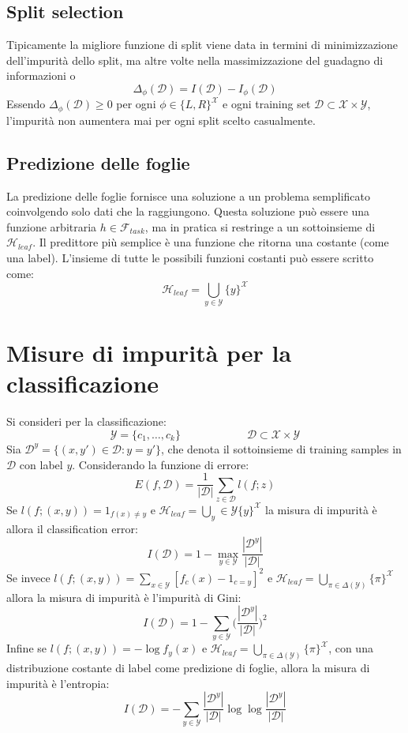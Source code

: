 	\subsection{Split selection}
	Tipicamente la migliore funzione di split viene data in termini di minimizzazione dell'impurit\`a dello split, ma altre volte nella massimizzazione del guadagno di informazioni o
	$$\Delta_\phi(\mathcal{D})=I(\mathcal{D})-I_\phi(\mathcal{D})$$
	Essendo $\Delta_\phi(\mathcal{D})\ge 0$ per ogni $\phi\in\{L,R\}^{\mathcal{X}}$ e ogni training set $\mathcal{D}\subset\mathcal{X}\times\mathcal{Y}$, l'impurit\`a non aumentera mai per ogni split scelto casualmente.

	\subsection{Predizione delle foglie}
	La predizione delle foglie fornisce una soluzione a un problema semplificato coinvolgendo solo dati che la raggiungono.
	Questa soluzione pu\`o essere una funzione arbitraria $h\in\mathcal{F}_{task}$, ma in pratica si restringe a un sottoinsieme di $\mathcal{H}_{leaf}$.
	Il predittore pi\`u semplice \`e una funzione che ritorna una costante (come una label).
	L'insieme di tutte le possibili funzioni costanti pu\`o essere scritto come:
	$$\mathcal{H}_{leaf} = \bigcup\limits_{y\in\mathcal{Y}}\{y\}^{\mathcal{X}}$$

\section{Misure di impurit\`a per la classificazione}
Si consideri per la classificazione:
$$\mathcal{Y} = \{c_1,\dots,c_k\}\qquad\qquad\qquad\mathcal{D}\subset\mathcal{X}\times\mathcal{Y}$$
Sia $\mathcal{D}^y = \{(x, y')\in \mathcal{D}: y = y'\}$, che denota il sottoinsieme di training samples in $\mathcal{D}$ con label $y$.
Considerando la funzione di errore:
$$E(f,\mathcal{D}) = \dfrac{1}{|\mathcal{D}|}\sum\limits_{z\in\mathcal{D}}l(f;z)$$
Se $l(f;(x,y))=1_{f(x)\neq y}$ e $\mathcal{H}_{leaf} = \bigcup\limits_y\in\mathcal{Y}\{y\}^\mathcal{X}$ la misura di impurit\`a \`e allora il classification error:
$$I(\mathcal{D})= 1 -\max\limits_{y\in\mathcal{Y}}\dfrac{|\mathcal{D}^y|}{|\mathcal{D}|}$$
Se invece $l(f;(x,y))=\sum\limits_{x\in\mathcal{Y}}[f_c(x)-1_{c=y}]^2$ e $\mathcal{H}_{leaf}=\bigcup\limits_{\pi\in\Delta(\mathcal{Y})}\{\pi\}^\mathcal{X}$ allora la misura di impurit\`a \`e l'impurit\`a di Gini:
$$I(\mathcal{D}) = 1-\sum\limits_{y\in\mathcal{Y}}\biggl(\dfrac{|\mathcal{D}^y|}{|\mathcal{D}|}\biggr)^2$$
Infine se $l(f;(x,y))=-\log f_y(x)$ e $\mathcal{H}_{leaf} = \bigcup\limits_{\pi\in\Delta(\mathcal{Y})}\{\pi\}^\mathcal{X}$, con una distribuzione costante di label come predizione di foglie, allora la misura di impurit\`a \`e l'entropia:
$$I(\mathcal{D})=-\sum\limits_{y\in\mathcal{Y}}\dfrac{|\mathcal{D}^y|}{|\mathcal{D}|}\log\log\dfrac{|\mathcal{D}^y|}{|\mathcal{D}|}$$

